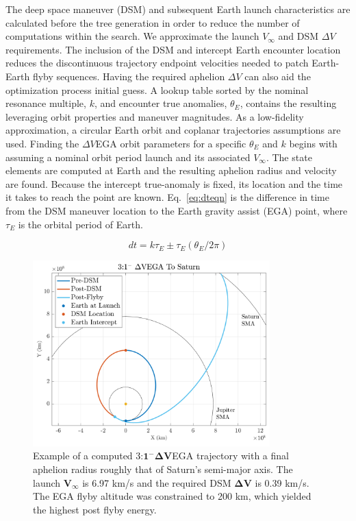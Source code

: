 \documentclass[letterpaper, preprint, paper,11pt]{AAS}	%
\begin{document}
The deep space maneuver (DSM) and subsequent Earth launch characteristics are calculated before the tree generation in order to reduce the number of computations within the search. We approximate the launch $V_\infty$ and DSM $\Delta V$ requirements. The inclusion of the DSM and intercept Earth encounter location reduces the discontinuous trajectory endpoint velocities needed to patch Earth-Earth flyby sequences. Having the required aphelion $\Delta V$ can also aid the optimization process initial guess. A lookup table sorted by the nominal resonance multiple, $k$, and encounter true anomalies, $\theta_{E}$, contains the resulting leveraging orbit properties and maneuver magnitudes. As a low-fidelity approximation, a circular Earth orbit and coplanar trajectories assumptions are used. Finding the $\Delta V$EGA orbit parameters for a specific $\theta_{E}$ and $k$ begins with assuming a nominal orbit period launch and its associated $V_\infty$. The state elements are computed at Earth and the resulting aphelion radius and velocity are found. Because the intercept true-anomaly is fixed, its location and the time it takes to reach the point are known. Eq.~\eqref{eq:dteqn} is the difference in time from the DSM maneuver location to the Earth gravity assist (EGA) point, where $\tau_E$ is the orbital period of Earth.

\begin{equation}
	\label{eq:dteqn}
	dt = k\tau_E \pm \tau_E(\theta_E/2\pi)
\end{equation}

\begin{figure}[htb]
	\centering\includegraphics[width=3.6in]{./fig/dsmmatlab}
    \caption{Example of a computed 3:$\boldsymbol{1^- \Delta V}$EGA trajectory with a final aphelion radius roughly that of Saturn's semi-major axis. The launch $\boldsymbol{V_\infty}$ is 6.97 km/s and the required DSM $\boldsymbol{\Delta V}$ is 0.39 km/s. The EGA flyby altitude was constrained to 200 km, which yielded the highest post flyby energy.}
	\label{fig:dsmmatlab}
\end{figure}
\end{document}
